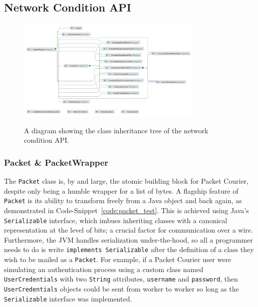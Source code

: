 \newpage

\subsection{Network Condition API}

\begin{figure}[!h]
    \includegraphics[width=0.8\textwidth]{images/chapter_4_implementation/network_condition_api_tree}
    \centering~\caption{A diagram showing the class inheritance tree of the network condition API.}
    \label{fig:chapter_4_implementation-network_condition_api_tree}
\end{figure}

\subsubsection{Packet \& PacketWrapper}

The \texttt{Packet} class is, by and large, the atomic building block for Packet Courier, despite only being a humble
wrapper for a list of bytes. A flagship feature of \texttt{Packet} is its ability to transform freely from a Java
object and back again, as demonstrated in Code-Snippet~\ref{code:packet_test}. This is achieved using Java's
\texttt{Serializable} interface\cite{java_Serializable}, which imbues inheriting classes with a canonical
representation at the level of bits; a crucial factor for communication over a wire. Furthermore, the JVM handles
serialization under-the-hood, so all a programmer needs to do is write \texttt{implements Serializable} after the
definition of a class they wish to be mailed as a \texttt{Packet}. For example, if a Packet Courier user were
simulating an authentication process using a custom class named \texttt{UserCredentials} with two \texttt{String}
attributes, \texttt{username} and \texttt{password}, then \texttt{UserCredentials} objects could be sent from worker
to worker so long as the \texttt{Serializable} interface was implemented.

